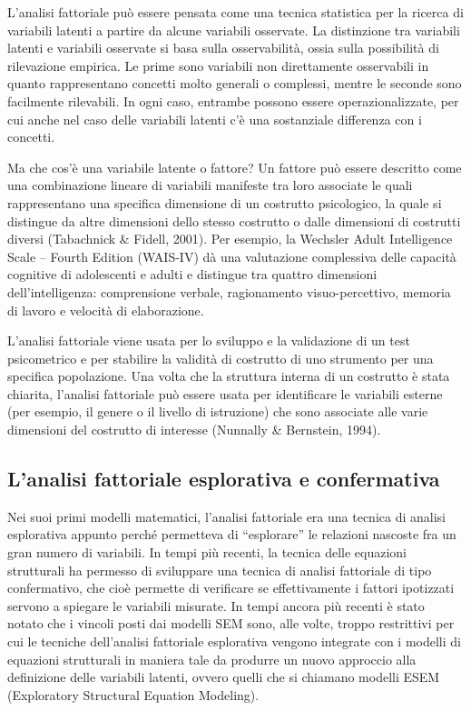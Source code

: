 \documentclass[
  11pt,
]{krantz}
\theoremstyle{definition}
\theoremstyle{definition}
\theoremstyle{definition}
\theoremstyle{definition}
\theoremstyle{remark}
\begin{document}
L'analisi fattoriale può essere pensata come una tecnica statistica per la ricerca di variabili latenti a partire da alcune variabili osservate. La distinzione tra variabili latenti e variabili osservate si basa sulla osservabilità, ossia sulla possibilità di rilevazione empirica. Le prime sono variabili non direttamente osservabili in quanto rappresentano concetti molto generali o complessi, mentre le seconde sono facilmente rilevabili. In ogni caso, entrambe possono essere operazionalizzate, per cui anche nel caso delle variabili latenti c'è una sostanziale differenza con i concetti.

Ma che cos'è una variabile latente o fattore? Un fattore può essere descritto come una combinazione lineare di variabili manifeste tra loro associate le quali rappresentano una specifica dimensione di un costrutto psicologico, la quale si distingue da altre dimensioni dello stesso costrutto o dalle dimensioni di costrutti diversi (Tabachnick \& Fidell, 2001). Per esempio, la Wechsler Adult Intelligence Scale -- Fourth Edition (WAIS-IV) dà una valutazione complessiva delle capacità cognitive di adolescenti e adulti e distingue tra quattro dimensioni dell'intelligenza: comprensione verbale, ragionamento visuo-percettivo, memoria di lavoro e velocità di elaborazione.

L'analisi fattoriale viene usata per lo sviluppo e la validazione di un test psicometrico e per stabilire la validità di costrutto di uno strumento per una specifica popolazione. Una volta che la struttura interna di un costrutto è stata chiarita, l'analisi fattoriale può essere usata per identificare le variabili esterne (per esempio, il genere o il livello di istruzione) che sono associate alle varie dimensioni del costrutto di interesse (Nunnally \& Bernstein, 1994).

\hypertarget{lanalisi-fattoriale-esplorativa-e-confermativa}{%
\subsection{L'analisi fattoriale esplorativa e confermativa}\label{lanalisi-fattoriale-esplorativa-e-confermativa}}

Nei suoi primi modelli matematici, l'analisi fattoriale era una tecnica di analisi esplorativa appunto perché permetteva di ``esplorare'' le relazioni nascoste fra un gran numero di variabili. In tempi più recenti, la tecnica delle equazioni strutturali ha permesso di sviluppare una tecnica di analisi fattoriale di tipo confermativo, che cioè permette di verificare se effettivamente i fattori ipotizzati servono a spiegare le variabili misurate. In tempi ancora più recenti è stato notato che i vincoli posti dai modelli SEM sono, alle volte, troppo restrittivi per cui le tecniche dell'analisi fattoriale esplorativa vengono integrate con i modelli di equazioni strutturali in maniera tale da produrre un nuovo approccio alla definizione delle variabili latenti, ovvero quelli che si chiamano modelli ESEM (Exploratory Structural Equation Modeling).
\end{document}
